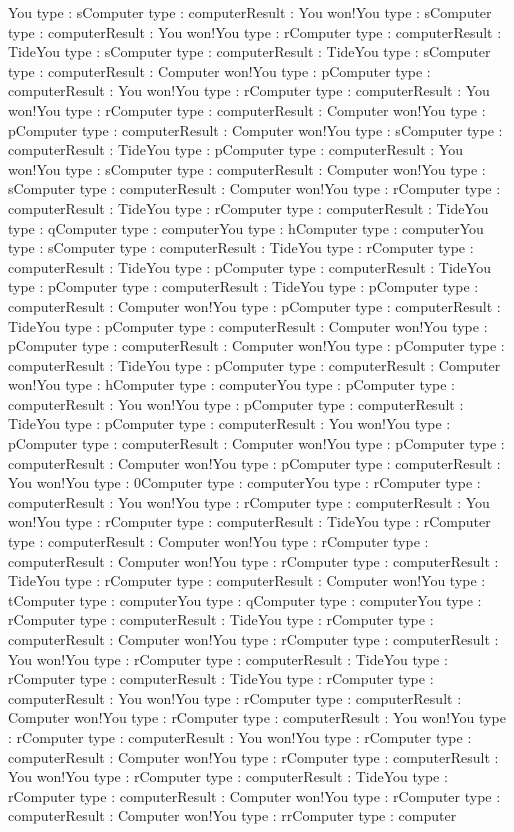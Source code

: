 
You type : sComputer type : {computer}Result : You won!You type : sComputer type : {computer}Result : You won!You type : rComputer type : {computer}Result : TideYou type : sComputer type : {computer}Result : TideYou type : sComputer type : {computer}Result : Computer won!You type : pComputer type : {computer}Result : You won!You type : rComputer type : {computer}Result : You won!You type : rComputer type : {computer}Result : Computer won!You type : pComputer type : {computer}Result : Computer won!You type : sComputer type : {computer}Result : TideYou type : pComputer type : {computer}Result : You won!You type : sComputer type : {computer}Result : Computer won!You type : sComputer type : {computer}Result : Computer won!You type : rComputer type : {computer}Result : TideYou type : rComputer type : {computer}Result : TideYou type : qComputer type : {computer}You type : hComputer type : {computer}You type : sComputer type : {computer}Result : TideYou type : rComputer type : {computer}Result : TideYou type : pComputer type : {computer}Result : TideYou type : pComputer type : {computer}Result : TideYou type : pComputer type : {computer}Result : Computer won!You type : pComputer type : {computer}Result : TideYou type : pComputer type : {computer}Result : Computer won!You type : pComputer type : {computer}Result : Computer won!You type : pComputer type : {computer}Result : TideYou type : pComputer type : {computer}Result : Computer won!You type : hComputer type : {computer}You type : pComputer type : {computer}Result : You won!You type : pComputer type : {computer}Result : TideYou type : pComputer type : {computer}Result : You won!You type : pComputer type : {computer}Result : Computer won!You type : pComputer type : {computer}Result : Computer won!You type : pComputer type : {computer}Result : You won!You type : 0Computer type : {computer}You type : rComputer type : {computer}Result : You won!You type : rComputer type : {computer}Result : You won!You type : rComputer type : {computer}Result : TideYou type : rComputer type : {computer}Result : Computer won!You type : rComputer type : {computer}Result : Computer won!You type : rComputer type : {computer}Result : TideYou type : rComputer type : {computer}Result : Computer won!You type : tComputer type : {computer}You type : qComputer type : {computer}You type : rComputer type : {computer}Result : TideYou type : rComputer type : {computer}Result : Computer won!You type : rComputer type : {computer}Result : You won!You type : rComputer type : {computer}Result : TideYou type : rComputer type : {computer}Result : TideYou type : rComputer type : {computer}Result : You won!You type : rComputer type : {computer}Result : Computer won!You type : rComputer type : {computer}Result : You won!You type : rComputer type : {computer}Result : You won!You type : rComputer type : {computer}Result : Computer won!You type : rComputer type : {computer}Result : You won!You type : rComputer type : {computer}Result : TideYou type : rComputer type : {computer}Result : Computer won!You type : rComputer type : {computer}Result : Computer won!You type : rrComputer type : {computer}